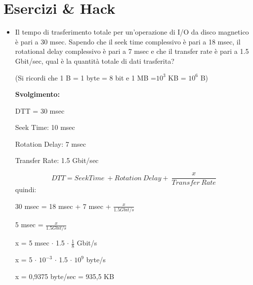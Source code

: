 \documentclass{article}
\begin{document}
\section{Esercizi \& Hack}
\begin{itemize}
    \item Il tempo di trasferimento totale per un'operazione di I/O da disco magnetico è pari a 30 msec. Sapendo che il seek time complessivo è pari a 18 msec, il rotational delay complessivo è pari a 7 msec e che il transfer rate è pari a 1.5 Gbit/sec, qual è la quantità totale di dati trasferita? \par(Si ricordi che 1 B = 1 byte = 8 bit e 1 MB =$10^{3}$ KB = $10^{6}$ B)\par
    \textbf{Svolgimento:}\par
    DTT = 30 msec\par
    Seek Time: 10 msec\par
    Rotation Delay: 7 msec\par
    Transfer Rate: 1.5 Gbit/sec\par
    \begin{equation}
        DTT = Seek Time\ + Rotation\ Delay +\ \frac{x}{Transfer\ Rate}
    \end{equation}
    quindi:\par
    \begin{center}
        30 msec = 18 msec + 7 msec + $\frac{x}{1.5 Gbit/s}$\par
        5 msec = $\frac{x}{1.5 Gbit/s}$\par
        x = 5 msec $\cdot$ 1.5 $\cdot$ $\frac{1}{8}$ Gbit/s\par
        x = 5 $\cdot$ $10^{-3}$ $\cdot$ 1.5 $\cdot$ $10^{9}$ byte/s\par
        x = 0,9375 byte/sec = 935,5 KB
    \end{center}


\end{itemize}
\end{document}

